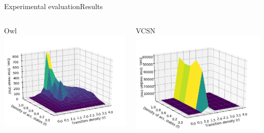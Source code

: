 \documentclass[10pt]{beamer}
\begin{document}
\begin{frame}{Experimental evaluation}{Results}
  \begin{columns}[T]
   \begin{column}{.5\textwidth}
       \begin{block}{Owl}
       \includegraphics[scale=0.4]{img/defense/this-average-antichain}
       \end{block}
     \end{column}
     \begin{column}{.5\textwidth}
         \begin{block}{VCSN}
            \includegraphics[scale=0.4]{img/defense/vcsn}
         \end{block}
     \end{column}
 \end{columns}
\end{frame}
\end{document}
